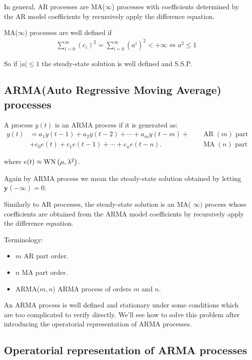 In general, AR processes are MA($\infty$) processes with coefficients determined by the AR model coefficients by recursively apply the difference equation.

MA($\infty$) processes are well defined if 
\begin{align*}
	\sum_{i=0}^{\infty} \left(c_{i}\right)^2=\sum_{i=0}^{\infty} \left(a^{i}\right)^2< +\infty \iff a^2\leq 1
\end{align*}

So if $|a|\leq1$ the steady-state solution is well defined and S.S.P.

\subsection{ARMA(Auto Regressive Moving Average) processes}

A process $y(t)$ is an ARMA process if it is generated as:
\begin{align*}
	y(t)&=a_{1} y(t-1)+a_{2} y(t-2)+\cdots+a_{m} y(t-m)+\quad &\operatorname{AR}(m) \text{ part}\\ &+c_{0} e(t)+c_{1} e(t-1)+\cdots+c_{n} e(t-n) . \quad &\operatorname{MA}(n) \text{ part}
\end{align*}

where $e(t) \approx \operatorname{WN}\left(\mu, \lambda^{2}\right)$.

Again by ARMA process we mean the steady-state solution obtained by letting $\mathbf{y}(-\infty)=0$.
 
Similarly to AR processes, the steady-state solution is an MA( $\infty)$ process whose coefficients are obtained from the ARMA model coefficients by recursively apply the difference equation.
 
Terminology:
\begin{itemize}
	\item $m$ AR part order.
	\item $n$ MA part order.
	\item ARMA($m,n$) ARMA process of orders $m$ and $n$.
\end{itemize}

An ARMA process is well defined and stationary under some conditions which are too complicated to verify directly.
We'll see how to solve this problem after introducing the operatorial 
representation of ARMA processes.

\subsection{Operatorial representation of ARMA processes}

